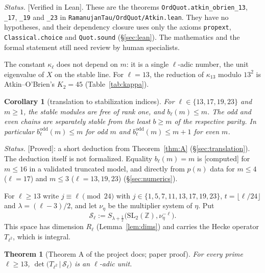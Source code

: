 \documentclass[11pt]{amsart}
\newcommand{\Z}{\mathbb{Z}}
\newcommand{\SL}{\mathrm{SL}_2(\Z)}
\newcommand{\cS}{\mathcal{S}}
\newcommand{\st}[1]{\textup{\textsf{[#1]}}}
\newcommand{\lean}[1]{\texttt{#1}}
\theoremstyle{plain}
\newtheorem{corollary}[theorem]{Corollary}
\newtheorem{mainthm}{Theorem}
\theoremstyle{definition}
\numberwithin{equation}{section}
\begin{document}
\noindent\emph{Status.} \st{Verified in Lean}. These are the theorems \lean{OrdQuot.atkin\_obrien\_13},
\lean{\_17}, \lean{\_19} and \lean{\_23} in \lean{RamanujanTau/OrdQuot/Atkin.lean}. They have no hypotheses, and their
dependency closure uses only the axioms \lean{propext}, \lean{Classical.choice} and \lean{Quot.sound}
(\S\ref{sec:lean}). The mathematics and the formal statement still need review by human specialists.

\medskip
The constant $\kappa_\ell$ does not depend on $m$: it is a single $\ell$-adic number, the unit eigenvalue of $X$ on the
stable line. For $\ell=13$, the reduction of $\kappa_{13}$ modulo $13^2$ is Atkin--O'Brien's $K_2=45$
(Table~\ref{tab:kappa}).

\begin{corollary}[translation to stabilization indices]\label{cor:bm}
For $\ell\in\{13,17,19,23\}$ and $m\ge1$, the stable modules are free of rank one, and $b_\ell(m)\le m$. The odd and even
chains are separately stable from the least $b\ge m$ of the respective parity. In particular
$b^{\mathrm{odd}}_\ell(m)\le m$ for odd $m$ and $b^{\mathrm{odd}}_\ell(m)\le m+1$ for even $m$.
\end{corollary}
\noindent\emph{Status.} \st{Proved}: a short deduction from Theorem~\ref{thm:A} (\S\ref{sec:translation}). The deduction
itself is not formalized. Equality $b_\ell(m)=m$ is \st{computed} for $m\le 16$ in a validated truncated model, and
directly from $p(n)$ data for $m\le 4$ ($\ell=17$) and $m\le 3$ ($\ell=13,19,23$) (\S\ref{sec:numerics}).

\medskip
For $\ell\ge 13$ write $j\equiv\ell\pmod{24}$ with $j\in\{1,5,7,11,13,17,19,23\}$, $t=\lfloor\ell/24\rfloor$ and
$\lambda=(\ell-3)/2$, and let $\nu_\eta$ be the multiplier system of $\eta$. Put
\[
  \cS_\ell:=S_{\lambda+\frac12}\big(\SL,\nu_\eta^{-\ell}\big).
\]
This space has dimension $R_\ell$ (Lemma~\ref{lem:dims}) and carries the Hecke operator $T_{\ell^2}$, which is integral.

\begin{mainthm}[Theorem A of the project docs; paper proof]\label{thm:B}
For every prime $\ell\ge13$, $\det\big(T_{\ell^2}\,|\,\cS_\ell\big)$ is an $\ell$-adic unit.
\end{mainthm}
\end{document}
